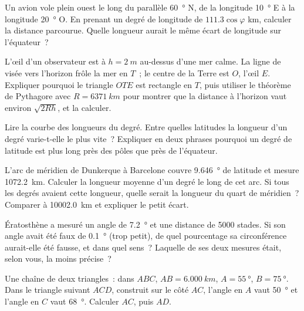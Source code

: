 \begin{exercise}[$\star\star$]\label{exo:g10:measuring-the-earth:8}
Un avion vole plein ouest le long du parallèle \qty{60}{\degree} N, de la
longitude \qty{10}{\degree} E à la longitude \qty{20}{\degree} O. En
prenant un degré de longitude de $111.3 \cos \varphi$ km, calculer la
distance parcourue. Quelle longueur aurait le même écart de longitude sur
l'équateur~?
\end{exercise}

\begin{exercise}[$\star\star$]\label{exo:g10:measuring-the-earth:9}
L'œil d'un observateur est à $h = \qty{2}{m}$ au-dessus d'une mer calme. La
ligne de visée vers l'horizon frôle la mer en $T$~; le centre de la Terre
est $O$, l'œil $E$. Expliquer pourquoi le triangle $OTE$ est rectangle en
$T$, puis utiliser le théorème de Pythagore avec $R = \qty{6371}{km}$ pour
montrer que la distance à l'horizon vaut environ $\sqrt{2Rh}$, et la
calculer.
\end{exercise}

\begin{exercise}[$\star\star$]\label{exo:g10:measuring-the-earth:10}
Lire la courbe des longueurs du degré. Entre quelles latitudes la longueur
d'un degré varie-t-elle le plus vite~? Expliquer en deux phrases pourquoi un
degré de latitude est plus long près des pôles que près de l'équateur.
\end{exercise}

\begin{exercise}[$\star\star$]\label{exo:g10:measuring-the-earth:11}
L'arc de méridien de Dunkerque à Barcelone couvre \qty{9.646}{\degree} de
latitude et mesure \qty{1072.2}{km}. Calculer la longueur moyenne d'un degré
le long de cet arc. Si tous les degrés avaient cette longueur, quelle serait
la longueur du quart de méridien~? Comparer à \qty{10002.0}{km} et
expliquer le petit écart.
\end{exercise}

\begin{exercise}[$\star\star\star$]\label{exo:g10:measuring-the-earth:12}
Ératosthène a mesuré un angle de \qty{7.2}{\degree} et une distance de 5000
stades. Si son angle avait été faux de \qty{0.1}{\degree} (trop petit), de
quel pourcentage sa circonférence aurait-elle été fausse, et dans quel
sens~? Laquelle de ses deux mesures était, selon vous, la moins précise~?
\end{exercise}

\begin{exercise}[$\star\star\star$]\label{exo:g10:measuring-the-earth:13}
Une chaîne de deux triangles~: dans $ABC$, $AB = \qty{6.000}{km}$,
$A = \qty{55}{\degree}$, $B = \qty{75}{\degree}$. Dans le triangle suivant
$ACD$, construit sur le côté $AC$, l'angle en $A$ vaut \qty{50}{\degree} et
l'angle en $C$ vaut \qty{68}{\degree}. Calculer $AC$, puis $AD$.
\end{exercise}

